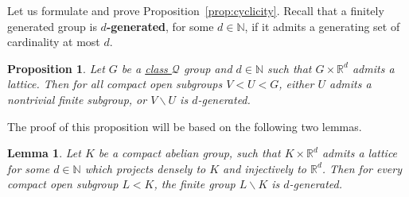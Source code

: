 \documentclass{amsart}
\numberwithin{equation}{subsection}
\newtheorem{lem}[thm]{Lemma}
\newtheorem{prop}[thm]{Proposition}
\theoremstyle{remark}
\begin{document}
Let us formulate and prove Proposition~\ref{prop:cyclicity}. Recall that a finitely generated group is {\bf \(d\)-generated}, for some \(d\in\mathbb{N}\), if it admits a generating set of cardinality at most \(d\).

\begin{prop}
Let \(G\) be a \hyperlink{classQ}{class \(\mathcal{Q}\)} group and \(d\in\mathbb{N}\) such that \(G\times\mathbb{R}^{d}\) admits a lattice. Then for all compact open subgroups \(V<U<G\), either \(U\) admits a nontrivial finite subgroup, or \(V\backslash U\) is \(d\)-generated.
\end{prop}

The proof of this proposition will be based on the following two lemmas.

\begin{lem}\label{lem:cyclicity1}
Let \(K\) be a compact abelian group, such that \(K\times\mathbb{R}^{d}\) admits a lattice for some \(d\in\mathbb{N}\) which projects densely to \(K\) and injectively to \(\mathbb{R}^{d}\). Then for every compact open subgroup \(L<K\), the finite group \(L\backslash K\) is \(d\)-generated.
\end{lem}
\end{document}
